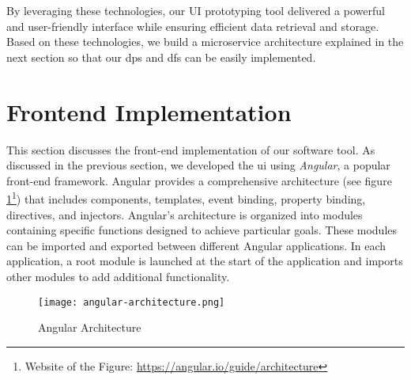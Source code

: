 By leveraging these technologies, our UI prototyping tool delivered a powerful and user-friendly interface while ensuring efficient data retrieval and storage.
Based on these technologies, we build a microservice architecture explained in the next section so that our \ac{dp}s and \ac{df}s can be easily implemented. 
\clearpage


\section{Frontend Implementation}
\label{implementation:section:frontend}

This section discusses the front-end implementation of our software tool. 
As discussed in the previous section, we developed the \ac{ui} using \textit{Angular}, a popular front-end framework. 
Angular provides a comprehensive architecture (see figure \ref{implementation:fig:angulararchitecture}\footnote{Website of the Figure: \url{https://angular.io/guide/architecture}}) that includes components, templates, event binding, property binding, directives, and injectors. 
Angular's architecture is organized into modules containing specific functions designed to achieve particular goals. 
These modules can be imported and exported between different Angular applications. 
In each application, a root module is launched at the start of the application and imports other modules to add additional functionality.

\begin{figure}[ht]
    \centering
    \texttt{[image: angular-architecture.png]}
    \caption[Angular Architecture]{Angular Architecture\footnotemark[7]}
    \label{implementation:fig:angulararchitecture}
\end{figure}

